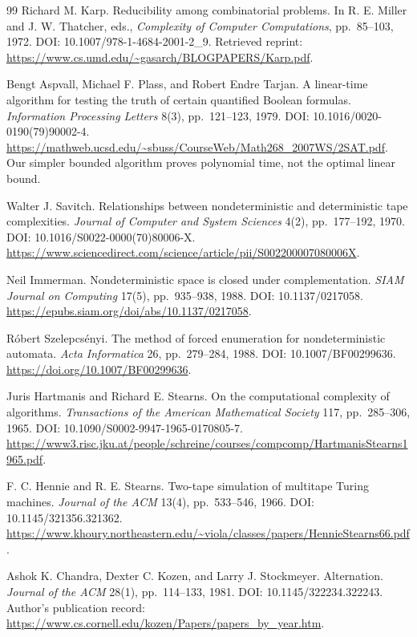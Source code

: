 \begin{thebibliography}{99}
Richard M. Karp. Reducibility among combinatorial problems. In R. E. Miller and J. W. Thatcher, eds., \emph{Complexity of Computer Computations}, pp.~85--103, 1972. DOI: 10.1007/978-1-4684-2001-2\_9. Retrieved reprint:
\url{https://www.cs.umd.edu/~gasarch/BLOGPAPERS/Karp.pdf}.

Bengt Aspvall, Michael F. Plass, and Robert Endre Tarjan. A linear-time algorithm for testing the truth of certain quantified Boolean formulas. \emph{Information Processing Letters} 8(3), pp.~121--123, 1979. DOI: 10.1016/0020-0190(79)90002-4.
\url{https://mathweb.ucsd.edu/~sbuss/CourseWeb/Math268_2007WS/2SAT.pdf}.
Our simpler bounded algorithm proves polynomial time, not the optimal linear bound.

Walter J. Savitch. Relationships between nondeterministic and deterministic tape complexities. \emph{Journal of Computer and System Sciences} 4(2), pp.~177--192, 1970. DOI: 10.1016/S0022-0000(70)80006-X.
\url{https://www.sciencedirect.com/science/article/pii/S002200007080006X}.

Neil Immerman. Nondeterministic space is closed under complementation. \emph{SIAM Journal on Computing} 17(5), pp.~935--938, 1988. DOI: 10.1137/0217058.
\url{https://epubs.siam.org/doi/abs/10.1137/0217058}.

R\'obert Szelepcs\'enyi. The method of forced enumeration for nondeterministic automata. \emph{Acta Informatica} 26, pp.~279--284, 1988. DOI: 10.1007/BF00299636.
\url{https://doi.org/10.1007/BF00299636}.

Juris Hartmanis and Richard E. Stearns. On the computational complexity of algorithms. \emph{Transactions of the American Mathematical Society} 117, pp.~285--306, 1965. DOI: 10.1090/S0002-9947-1965-0170805-7.
\url{https://www3.risc.jku.at/people/schreine/courses/compcomp/HartmanisStearns1965.pdf}.

F. C. Hennie and R. E. Stearns. Two-tape simulation of multitape Turing machines. \emph{Journal of the ACM} 13(4), pp.~533--546, 1966. DOI: 10.1145/321356.321362.
\url{https://www.khoury.northeastern.edu/~viola/classes/papers/HennieStearns66.pdf}.

Ashok K. Chandra, Dexter C. Kozen, and Larry J. Stockmeyer. Alternation. \emph{Journal of the ACM} 28(1), pp.~114--133, 1981. DOI: 10.1145/322234.322243. Author's publication record:
\url{https://www.cs.cornell.edu/kozen/Papers/papers_by_year.htm}.


\end{thebibliography}
